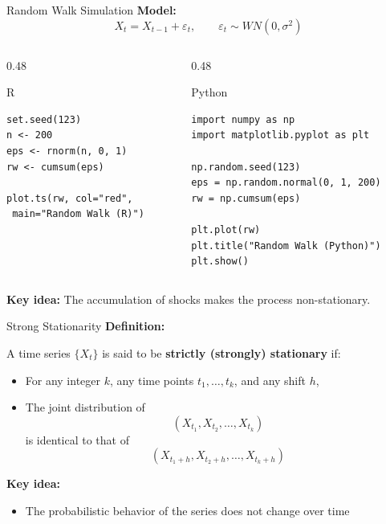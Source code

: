 \documentclass[aspectratio=169]{beamer}
\begin{document}
\begin{frame}[fragile]{Random Walk Simulation}
\small
\textbf{Model:}
\[
X_t = X_{t-1} + \varepsilon_t, \qquad \varepsilon_t \sim WN(0,\sigma^2)
\]

\vspace{0.2cm}

\begin{columns}[T]
\begin{column}{0.48\textwidth}
\begin{block}{R}
\begin{verbatim}
set.seed(123)
n <- 200
eps <- rnorm(n, 0, 1)
rw <- cumsum(eps)

plot.ts(rw, col="red",
 main="Random Walk (R)")
\end{verbatim}
\end{block}
\end{column}

\begin{column}{0.48\textwidth}
\begin{block}{Python}
\begin{verbatim}
import numpy as np
import matplotlib.pyplot as plt

np.random.seed(123)
eps = np.random.normal(0, 1, 200)
rw = np.cumsum(eps)

plt.plot(rw)
plt.title("Random Walk (Python)")
plt.show()
\end{verbatim}
\end{block}
\end{column}
\end{columns}

\vspace{0.2cm}
\textbf{Key idea:} The accumulation of shocks makes the process non-stationary.
\end{frame}



\begin{frame}{Strong Stationarity}
\textbf{Definition:}

\vspace{0.3cm}

A time series $\{X_t\}$ is said to be \textbf{strictly (strongly) stationary} if:

\begin{itemize}
    \item For any integer $k$, any time points $t_1, \dots, t_k$, and any shift $h$,
    \item The joint distribution of 
    \[
    (X_{t_1}, X_{t_2}, \dots, X_{t_k})
    \]
    is identical to that of
    \[
    (X_{t_1+h}, X_{t_2+h}, \dots, X_{t_k+h})
    \]
\end{itemize}

\vspace{0.4cm}

\textbf{Key idea:}
\begin{itemize}
    \item The probabilistic behavior of the series does not change over time
\end{itemize}

\end{frame}
\end{document}
